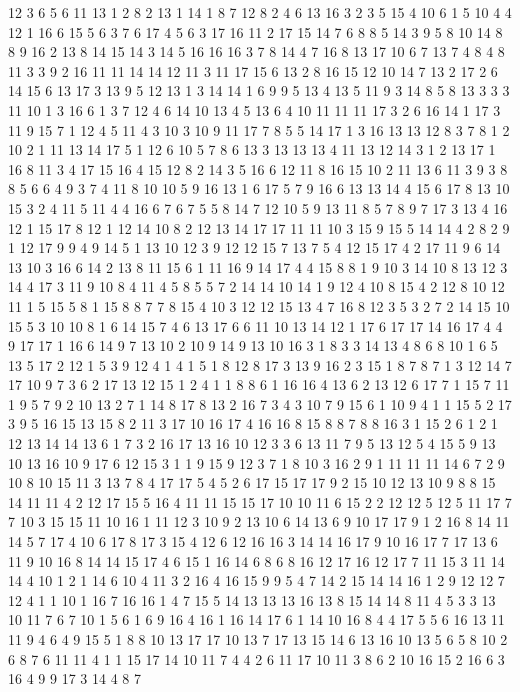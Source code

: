 12 3 6 5 6 11 13 1 2 8 2 13 
1 14 1 8 7 12 8 2 4 6 13 16 
3 2 3 5 15 4 10 6 1 5 10 4 
4 12 1 16 6 15 5 6 3 7 6 17 
4 5 6 3 17 16 11 2 17 15 14 7 
6 8 8 5 14 3 9 5 8 10 14 8 
8 9 16 2 13 8 14 15 14 3 14 5 
16 16 16 3 7 8 14 4 7 16 8 13 
17 10 6 7 13 7 4 8 4 8 11 3 
3 9 2 16 11 11 14 14 12 11 3 11 
17 15 6 13 2 8 16 15 12 10 14 7 
13 2 17 2 6 14 15 6 13 17 3 13 
9 5 12 13 1 3 14 14 1 6 9 9 
5 13 4 13 5 11 9 3 14 8 5 8 
13 3 3 3 11 10 1 3 16 6 1 3 
7 12 4 6 14 10 13 4 5 13 6 4 
10 11 11 11 17 3 2 6 16 14 1 17 
3 11 9 15 7 1 12 4 5 11 4 3 
10 3 10 9 11 17 7 8 5 5 14 17 
1 3 16 13 13 12 8 3 7 8 1 2 
10 2 1 11 13 14 17 5 1 12 6 10 
5 7 8 6 13 3 13 13 13 4 11 13 
12 14 3 1 2 13 17 1 16 8 11 3 
4 17 15 16 4 15 12 8 2 14 3 5 
16 6 12 11 8 16 15 10 2 11 13 6 
11 3 9 3 8 8 5 6 6 4 9 3 
7 4 11 8 10 10 5 9 16 13 1 6 
17 5 7 9 16 6 13 13 14 4 15 6 
17 8 13 10 15 3 2 4 11 5 11 4 
4 16 6 7 6 7 5 5 8 14 7 12 
10 5 9 13 11 8 5 7 8 9 7 17 
3 13 4 16 12 1 15 17 8 12 1 12 
14 10 8 2 12 13 14 17 17 11 11 10 
3 15 9 15 5 14 14 4 2 8 2 9 
1 12 17 9 9 4 9 14 5 1 13 10 
12 3 9 12 12 15 7 13 7 5 4 12 
15 17 4 2 17 11 9 6 14 13 10 3 
16 6 14 2 13 8 11 15 6 1 11 16 
9 14 17 4 4 15 8 8 1 9 10 3 
14 10 8 13 12 3 14 4 17 3 11 9 
10 8 4 11 4 5 8 5 5 7 2 14 
14 10 14 1 9 12 4 10 8 15 4 2 
12 8 10 12 11 1 5 15 5 8 1 15 
8 8 7 7 8 15 4 10 3 12 12 15 
13 4 7 16 8 12 3 5 3 2 7 2 
14 15 10 15 5 3 10 10 8 1 6 14 
15 7 4 6 13 17 6 6 11 10 13 14 
12 1 17 6 17 17 14 16 17 4 4 9 
17 17 1 16 6 14 9 7 13 10 2 10 
9 14 9 13 10 16 3 1 8 3 3 14 
13 4 8 6 8 10 1 6 5 13 5 17 
2 12 1 5 3 9 12 4 1 4 1 5 
1 8 12 8 17 3 13 9 16 2 3 15 
1 8 7 8 7 1 3 12 14 7 17 10 
9 7 3 6 2 17 13 12 15 1 2 4 
1 1 8 8 6 1 16 16 4 13 6 2 
13 12 6 17 7 1 15 7 11 1 9 5 
7 9 2 10 13 2 7 1 14 8 17 8 
13 2 16 7 3 4 3 10 7 9 15 6 
1 10 9 4 1 1 15 5 2 17 3 9 
5 16 15 13 15 8 2 11 3 17 10 16 
17 4 16 16 8 15 8 8 7 8 8 16 
3 1 15 2 6 1 2 1 12 13 14 14 
13 6 1 7 3 2 16 17 13 16 10 12 
3 3 6 13 11 7 9 5 13 12 5 4 
15 5 9 13 10 13 16 10 9 17 6 12 
15 3 1 1 9 15 9 12 3 7 1 8 
10 3 16 2 9 1 11 11 11 14 6 7 
2 9 10 8 10 15 11 3 13 7 8 4 
17 17 5 4 5 2 6 17 15 17 17 9 
2 15 10 12 13 10 9 8 8 15 14 11 
11 4 2 12 17 15 5 16 4 11 11 15 
15 17 10 10 11 6 15 2 2 12 12 5 
12 5 11 17 7 7 10 3 15 15 11 10 
16 1 11 12 3 10 9 2 13 10 6 14 
13 6 9 10 17 17 9 1 2 16 8 14 
11 14 5 7 17 4 10 6 17 8 17 3 
15 4 12 6 12 16 16 3 14 14 16 17 
9 10 16 17 7 17 13 6 11 9 10 16 
8 14 14 15 17 4 6 15 1 16 14 6 
8 6 8 16 12 17 16 12 17 7 11 15 
3 11 14 14 4 10 1 2 1 14 6 10 
4 11 3 2 16 4 16 15 9 9 5 4 
7 14 2 15 14 14 16 1 2 9 12 12 
7 12 4 1 1 10 1 16 7 16 16 1 
4 7 15 5 14 13 13 13 16 13 8 15 
14 14 8 11 4 5 3 3 13 10 11 7 
6 7 10 1 5 6 1 6 9 16 4 16 
1 16 14 17 6 1 14 10 16 8 4 4 
17 5 5 6 16 13 11 11 9 4 6 4 
9 15 5 1 8 8 10 13 17 17 10 13 
7 17 13 15 14 6 13 16 10 13 5 6 
5 8 10 2 6 8 7 6 11 11 4 1 
1 15 17 14 10 11 7 4 4 2 6 11 
17 10 11 3 8 6 2 10 16 15 2 16 
6 3 16 4 9 9 17 3 14 4 8 7 

